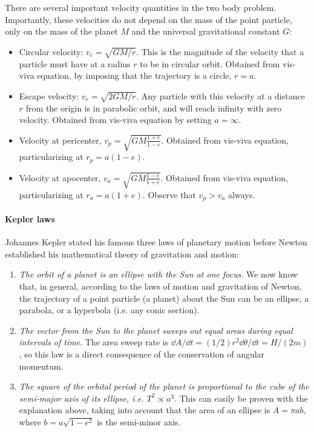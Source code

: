 There are several important velocity quantities in the two body problem. 
Importantly, these velocities do not depend on the mass of the point particle, 
only on the mass of the planet $M$ and the universal gravitational constant 
$G$:
%
\begin{itemize}
\item Circular velocity: $v_c=\sqrt{GM/r}$. This is the magnitude of the 
velocity that a particle must have at a radius $r$ to be in circular orbit. 
Obtained from vis-viva equation, by imposing that the trajectory is a circle, 
$r=a$. 
\item Escape velocity: $v_e=\sqrt{2GM/r}$. Any particle with this velocity at 
a distance $r$ from the origin is in parabolic orbit, and will reach infinity
with zero velocity. Obtained from vis-viva equation by setting $a=\infty$.
\item Velocity at pericenter, $v_p=\sqrt{GM\frac{1+e}{1-e}}$. Obtained from 
vis-viva equation, particularizing at $r_p=a(1-e)$.
\item Velocity at apocenter, $v_a=\sqrt{GM\frac{1-e}{1+e}}$. Obtained from 
vis-viva equation, particularizing at $r_a=a(1+e)$. Observe that $v_p>v_a$ 
always.
\end{itemize}
%

\paragraph{Kepler laws}

Johannes Kepler stated his famous three laws of planetary motion before
Newton established his mathematical theory of gravitation and motion:
%
\begin{enumerate}

\item \emph{The orbit of a planet is  an ellipse with the Sun at one focus}.
We now know that, in general, according to the laws of motion and gravitation
of Newton, the trajectory of a point particle (a planet) about the Sun can be
an ellipse, a parabola, or a hyperbola (i.e. any conic section).
    
\item \emph{The vector from the Sun to the planet sweeps out equal areas
during equal intervals of time}. The area sweep rate is $\dd A /\dd t =
(1/2)r^2 \dd\theta /\dd t = H/(2m)$, so this law is a direct consequence of
the conservation of angular momentum.

\item \emph{The square of the orbital period of the planet is proportional to
the cube of the semi-major axis of its ellipse, i.e. $T^2 \propto a^3$}. This
can easily be proven with the explanation above, taking into account that the
area of an ellipse is $A=\pi a b$, where $b=a\sqrt{1-e^2}$ is the semi-minor
axis.

\end{enumerate}





